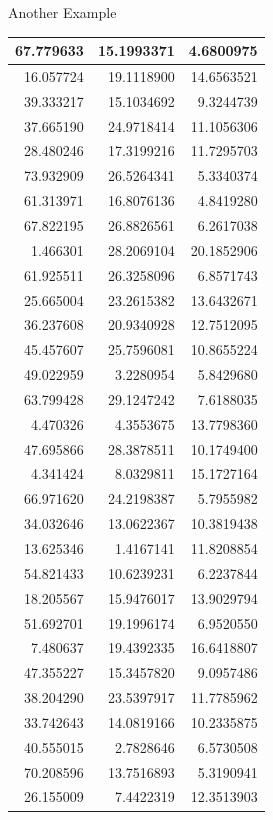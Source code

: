 \documentclass[
  ignorenonframetext,
]{beamer}
\begin{document}
\begin{frame}{Another Example}
\begin{table}
\begin{tabular}[t]{r|r|r}
\hline
67.779633 & 15.1993371 & 4.6800975\\
\hline
16.057724 & 19.1118900 & 14.6563521\\
\hline
39.333217 & 15.1034692 & 9.3244739\\
\hline
37.665190 & 24.9718414 & 11.1056306\\
\hline
28.480246 & 17.3199216 & 11.7295703\\
\hline
73.932909 & 26.5264341 & 5.3340374\\
\hline
61.313971 & 16.8076136 & 4.8419280\\
\hline
67.822195 & 26.8826561 & 6.2617038\\
\hline
1.466301 & 28.2069104 & 20.1852906\\
\hline
61.925511 & 26.3258096 & 6.8571743\\
\hline
25.665004 & 23.2615382 & 13.6432671\\
\hline
36.237608 & 20.9340928 & 12.7512095\\
\hline
45.457607 & 25.7596081 & 10.8655224\\
\hline
49.022959 & 3.2280954 & 5.8429680\\
\hline
63.799428 & 29.1247242 & 7.6188035\\
\hline
4.470326 & 4.3553675 & 13.7798360\\
\hline
47.695866 & 28.3878511 & 10.1749400\\
\hline
4.341424 & 8.0329811 & 15.1727164\\
\hline
66.971620 & 24.2198387 & 5.7955982\\
\hline
34.032646 & 13.0622367 & 10.3819438\\
\hline
13.625346 & 1.4167141 & 11.8208854\\
\hline
54.821433 & 10.6239231 & 6.2237844\\
\hline
18.205567 & 15.9476017 & 13.9029794\\
\hline
51.692701 & 19.1996174 & 6.9520550\\
\hline
7.480637 & 19.4392335 & 16.6418807\\
\hline
47.355227 & 15.3457820 & 9.0957486\\
\hline
38.204290 & 23.5397917 & 11.7785962\\
\hline
33.742643 & 14.0819166 & 10.2335875\\
\hline
40.555015 & 2.7828646 & 6.5730508\\
\hline
70.208596 & 13.7516893 & 5.3190941\\
\hline
26.155009 & 7.4422319 & 12.3513903\\

\end{tabular}
\end{table}
\end{frame}
\end{document}
